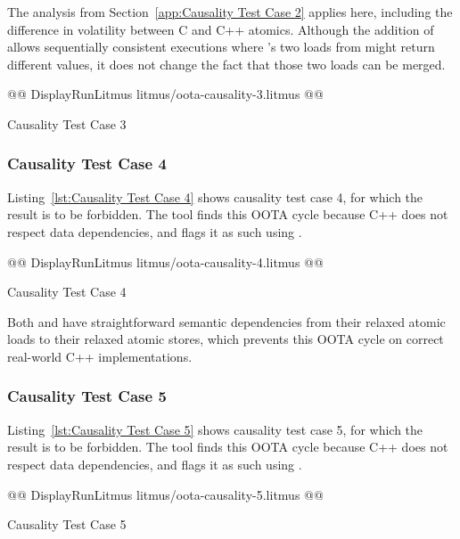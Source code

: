 \documentclass[10]{article}
\begin{document}
The analysis from Section~\ref{app:Causality Test Case 2}
applies here, including the difference in volatility between C and C++
atomics.
Although the addition of  allows sequentially consistent executions
where 's two loads from  might return different values,
it does not change the fact that those two loads can be merged.

\begin{listing}[tbp]
@@ DisplayRunLitmus litmus/oota-causality-3.litmus @@
\caption{Causality Test Case 3}
\label{lst:Causality Test Case 3}
\end{listing}

\subsubsection{Causality Test Case 4}
\label{app:Causality Test Case 4}

Listing~\ref{lst:Causality Test Case 4}
shows causality test case 4, for which the  result
is to be forbidden.
The  tool finds this OOTA cycle because C++ does not respect
data dependencies, and flags it as such using .

\begin{listing}[tbp]
@@ DisplayRunLitmus litmus/oota-causality-4.litmus @@
\caption{Causality Test Case 4}
\label{lst:Causality Test Case 4}
\end{listing}

Both  and  have straightforward semantic dependencies
from their relaxed atomic loads to their relaxed atomic stores, which
prevents this OOTA cycle on correct real-world C++ implementations.

\subsubsection{Causality Test Case 5}
\label{app:Causality Test Case 5}

Listing~\ref{lst:Causality Test Case 5}
shows causality test case 5, for which the 
result is to be forbidden.
The  tool finds this OOTA cycle because C++ does not respect
data dependencies, and flags it as such using .

\begin{listing}[tbp]
@@ DisplayRunLitmus litmus/oota-causality-5.litmus @@
\caption{Causality Test Case 5}
\label{lst:Causality Test Case 5}
\end{listing}
\end{document}

